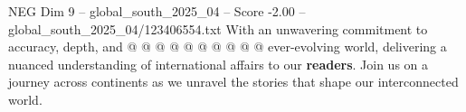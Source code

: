 \begin{textsample}{NEG Dim 9 – global\_south\_2025\_04 – Score -2.00 – global\_south\_2025\_04/123406554.txt}
With an unwavering commitment to accuracy, depth, and @ @ @ @ @ @ @ @ @ @ ever-evolving world, delivering a nuanced understanding of international affairs to our \textbf{readers}.
Join us on a journey across continents as we unravel the stories that shape our interconnected world.

\end{textsample}
